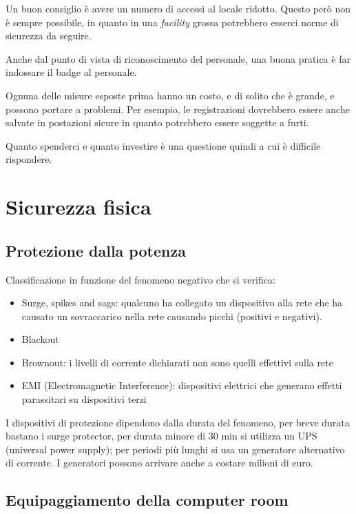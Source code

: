 Un buon consiglio è avere un numero di accessi al locale ridotto. Questo però 
non è sempre possibile, in quanto in una \textit{facility} grossa potrebbero 
esserci norme di sicurezza da seguire.

Anche dal punto di vista di riconoscimento del personale, una buona pratica è 
far indossare il badge al personale.

Ognuna delle misure esposte prima hanno un costo, e di solito che è grande, e 
possono portare a problemi. Per esempio, le registrazioni dovrebbero essere 
anche salvate in postazioni sicure in quanto potrebbero essere soggette a furti.

Quanto spenderci e quanto investire è una questione quindi a cui è difficile 
rispondere.

\section{Sicurezza fisica}

\subsection{Protezione dalla potenza}

Classificazione in funzione del fenomeno negativo che si verifica:
\begin{itemize}
\item Surge, spikes and sags: qualcuno ha collegato un dispositivo alla rete che 
ha causato un sovraccarico nella rete causando picchi (positivi e negativi).
\item Blackout
\item Brownout: i livelli di corrente dichiarati non sono quelli effettivi sulla 
rete
\item EMI (Electromagnetic Interference): dispositivi elettrici che generano 
effetti parassitari su dispositivi terzi
\end{itemize}

I dispositivi di protezione dipendono dalla durata del fenomeno, per breve 
durata bastano i surge protector, per durata minore di 30 min si utilizza un UPS 
(universal power supply); per periodi più lunghi si usa un generatore 
alternativo di corrente. I generatori possono arrivare anche a costare milioni 
di euro.

\subsection{Equipaggiamento della computer room}

